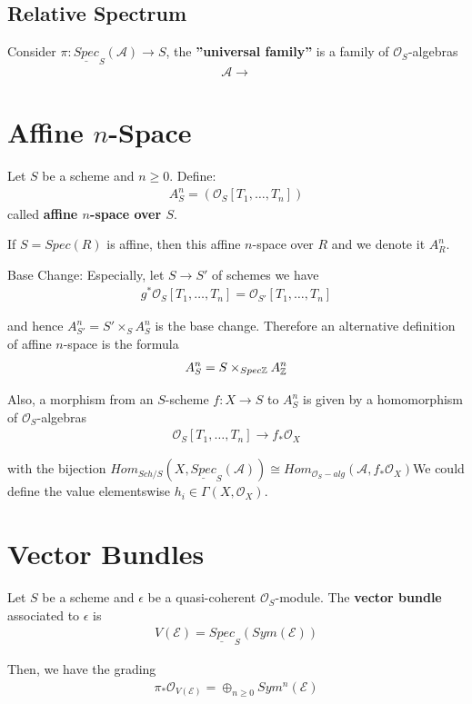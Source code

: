 \documentclass[Total.tex]{subfiles}
\begin{document}
			\subsection{Relative Spectrum}
				\begin{Def}
					Consider $\pi:\underline{Spec}_S(\mathcal{A})\rightarrow S$, the \textbf{''universal family''} is a family of $\mathcal{O}_S$-algebras
					\begin{gather*}
						\mathcal{A}\rightarrow 
					\end{gather*}
				\end{Def}
		\section{Affine $n$-Space}
			\begin{Def}
				Let $S$ be a scheme and $n\geq0$. Define:
				\begin{gather*}
					A^n_S=(\mathcal{O}_S[T_1,\dots,T_n])
				\end{gather*}
				called \textbf{affine $n$-space over $S$}. 
				
				If $S=Spec(R)$ is affine, then this affine $n$-space over $R$ and we denote it $A^n_R$.
			\end{Def}
			
			Base Change: Especially, let $S\rightarrow S'$ of schemes we have
			\begin{gather*}
				g^*\mathcal{O}_S[T_1,\dots,T_n]=\mathcal{O}_{S'}[T_1,\dots,T_n]
			\end{gather*}
			
			and hence $A^n_{S'}=S'\times_S A_S^n$ is the base change. Therefore an alternative definition of affine $n$-space is the formula
			\begin{gather*}
				A^n_S=S\times_{Spec\mathbb{Z}} A^n_{\mathbb{Z}}
			\end{gather*}
			
			Also, a morphism from an $S$-scheme $f:X\rightarrow S$ to $A^n_S$ is given by a homomorphism of $\mathcal{O}_S$-algebras
			\begin{gather*}
				\mathcal{O}_S[T_1,\dots,T_n]\rightarrow f_*\mathcal{O}_X
			\end{gather*}
			
			with the bijection $Hom_{Sch/S}(X,\underline{Spec}_S(\mathcal{A}))\cong Hom_{\mathcal{O}_S-alg}(\mathcal{A},f_*\mathcal{O}_X)$We could define the value elementswise $h_i\in \Gamma(X,\mathcal{O}_X)$.
		\section{Vector Bundles}
			\begin{Def}
				Let $S$ be a scheme and $\epsilon$ be a quasi-coherent $\mathcal{O}_S$-module. The \textbf{vector bundle} associated to $\epsilon$ is
				\begin{gather*}
					V(\mathcal{E})=\underline{Spec}_S(Sym(\mathcal{E}))
				\end{gather*}
			\end{Def}
			Then, we have the grading
			\begin{gather*}
				\pi_*\mathcal{O}_{V(\mathcal{E})}=\oplus_{n\geq 0} Sym^n(\mathcal{E})
			\end{gather*}
			
\end{document}

